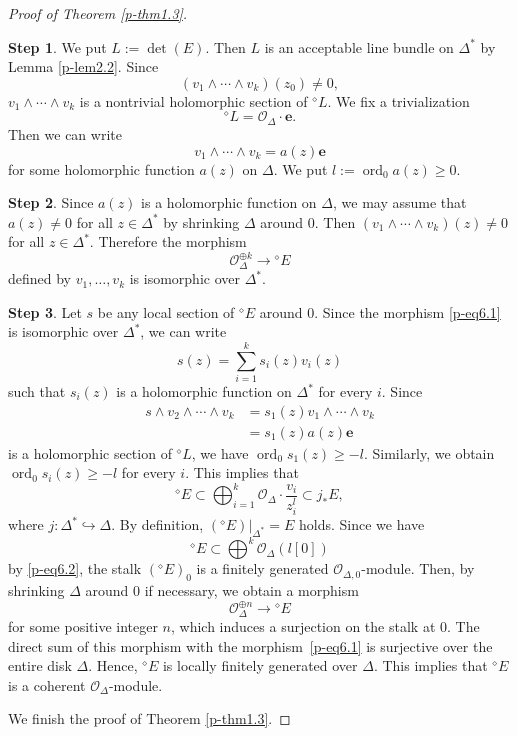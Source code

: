 \documentclass[12pt,twoside]{amsart}
\DeclareMathOperator{\ord}{ord}
\theoremstyle{definition}
\newtheorem{step}{Step}
\begin{document}
\begin{proof}[Proof of Theorem \ref{p-thm1.3}]
\begin{step}\label{p-step1.3-3}
We put $L:=\det (E)$. 
Then $L$ is an acceptable line bundle on $\Delta^*$ by Lemma \ref{p-lem2.2}. 
Since 
\[
\left(v_1\wedge \cdots \wedge v_k\right)(z_0)\ne 0, 
\] 
$v_1\wedge \cdots \wedge v_k$ is a nontrivial holomorphic 
section of ${}^\diamond\! L$. We fix a trivialization 
\[
{}^\diamond\! L=\mathcal O_{\Delta}\cdot \mathbf e. 
\] 
Then we can write 
\[
v_1\wedge \cdots \wedge v_k =a(z)\mathbf e
\] 
for some holomorphic function $a(z)$ on $\Delta$. 
We put $l:=\ord _0 a(z)\geq 0$. 
\end{step}
\begin{step}\label{p-step1.3-4} 
Since $a(z)$ is a holomorphic function on $\Delta$,
we may assume that $a(z)\not=0$ for all $z \in \Delta^*$
by shrinking $\Delta$ around $0$.
Then
$\left(v_1\wedge \cdots \wedge v_k\right)(z)\ne 0$
for all $z \in \Delta^*$.
Therefore the morphism
\begin{equation}
\label{p-eq6.1}
\mathcal{O}_{\Delta}^{\oplus k} \rightarrow {}^\diamond\! E
\end{equation}
defined by $v_1, \dots, v_k$ is isomorphic over $\Delta^*$. 
\end{step}
\begin{step}\label{p-step1.3-5}
Let $s$ be any local section of ${}^\diamond\!E$ around $0$. 
Since the morphism \eqref{p-eq6.1} is isomorphic over $\Delta^*$, 
we can write 
\[
s(z)=\sum _{i=1}^k s_i(z) v_i(z)
\] 
such that $s_i(z)$ is a holomorphic function on $\Delta^*$ for 
every $i$. 
Since 
\[
\begin{split}
s\wedge v_2\wedge \cdots \wedge v_k&= s_1 (z) v_1\wedge 
\cdots \wedge v_k \\ 
&=s_1(z) a(z) \mathbf e
\end{split} 
\] 
is a holomorphic section of ${}^\diamond\!L$, 
we have $\ord _0s_1(z)\geq -l$. 
Similarly, we obtain $\ord _0s_i(z)\geq -l$ for 
every $i$. 
This implies that 
\begin{equation}\label{p-eq6.2} 
{}^\diamond\!E\subset \bigoplus _{i=1}^k \mathcal O_{\Delta} 
\cdot \frac{v_i}{z^l_i}\subset j_*E, 
\end{equation} 
where $j\colon \Delta^*\hookrightarrow \Delta$. 
By definition, $\left({}^\diamond\!E\right)|_{\Delta^*}=E$ holds. 
Since we have 
\[
{}^\diamond\!E\subset \bigoplus ^k \mathcal O_\Delta (l [0])
\] 
by \eqref{p-eq6.2}, 
the stalk $\left({}^\diamond\! E\right)_0$ is a finitely 
generated $\mathcal O_{\Delta, 0}$-module. 
Then, by shrinking $\Delta$ around $0$ if necessary,  
we obtain a morphism 
\[
\mathcal{O}_{\Delta}^{\oplus n} \rightarrow {}^\diamond\!E
\]
for some positive integer $n$,  
which induces a surjection on the stalk at $0$. 
The direct sum of this morphism with the morphism~\eqref{p-eq6.1} 
is surjective over the entire disk $\Delta$. 
Hence, ${}^\diamond\!E$ is locally finitely generated over $\Delta$.  
This implies that ${}^\diamond\!E$ is a coherent $\mathcal{O}_\Delta$-module. 
\end{step}
We finish the proof of Theorem \ref{p-thm1.3}. 
\end{proof}
\end{document}
